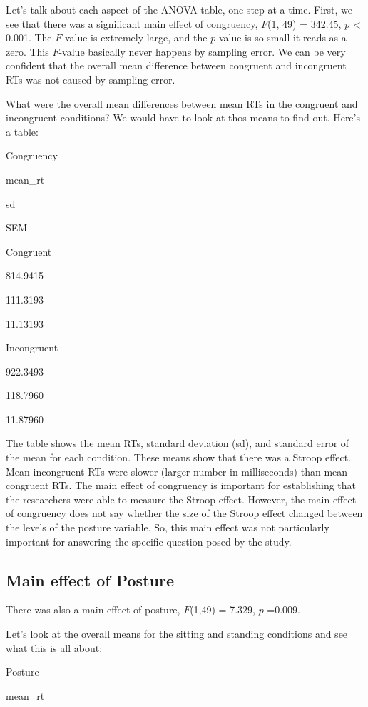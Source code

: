 \documentclass[
]{book}
\begin{document}
Let's talk about each aspect of the ANOVA table, one step at a time. First, we see that there was a significant main effect of congruency, \(F\)(1, 49) = 342.45, \(p\) \textless{} 0.001. The \(F\) value is extremely large, and the \(p\)-value is so small it reads as a zero. This \(F\)-value basically never happens by sampling error. We can be very confident that the overall mean difference between congruent and incongruent RTs was not caused by sampling error.

What were the overall mean differences between mean RTs in the congruent and incongruent conditions? We would have to look at thos means to find out. Here's a table:

Congruency

mean\_rt

sd

SEM

Congruent

814.9415

111.3193

11.13193

Incongruent

922.3493

118.7960

11.87960

The table shows the mean RTs, standard deviation (sd), and standard error of the mean for each condition. These means show that there was a Stroop effect. Mean incongruent RTs were slower (larger number in milliseconds) than mean congruent RTs. The main effect of congruency is important for establishing that the researchers were able to measure the Stroop effect. However, the main effect of congruency does not say whether the size of the Stroop effect changed between the levels of the posture variable. So, this main effect was not particularly important for answering the specific question posed by the study.

\hypertarget{main-effect-of-posture}{%
\subsection{Main effect of Posture}\label{main-effect-of-posture}}

There was also a main effect of posture, \(F\)(1,49) = 7.329, \(p\) =0.009.

Let's look at the overall means for the sitting and standing conditions and see what this is all about:

Posture

mean\_rt
\end{document}
